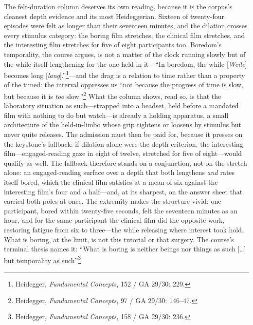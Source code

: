 \documentclass{article}
\begin{document}
The felt-duration column deserves its own reading, because it is the corpus's cleanest depth evidence and its most Heideggerian. Sixteen of twenty-four episodes were felt as longer than their seventeen minutes, and the dilation crosses every stimulus category: the boring film stretches, the clinical film stretches, and the interesting film stretches for five of eight participants too. Boredom's temporality, the course argues, is not a matter of the clock running slowly but of the while itself lengthening for the one held in it---``In boredom, the while [\textit{Weile}] becomes long [\textit{lang}].''\footnote{Heidegger, \textit{Fundamental Concepts}, 152 / GA 29/30: 229.}---and the drag is a relation to time rather than a property of the timed: the interval oppresses us ``not because the progress of time is slow, but because it is \textit{too} slow.''\footnote{Heidegger, \textit{Fundamental Concepts}, 97 / GA 29/30: 146--47.} What the column shows, read so, is that the laboratory situation as such---strapped into a headset, held before a mandated film with nothing to do but watch---is already a holding apparatus, a small architecture of the held-in-limbo whose grip tightens or loosens by stimulus but never quite releases. The admission must then be paid for, because it presses on the keystone's fallback: if dilation alone were the depth criterion, the interesting film---engaged-reading gaze in eight of twelve, stretched for five of eight---would qualify as well. The fallback therefore stands on a conjunction, not on the stretch alone: an engaged-reading surface over a depth that both lengthens \textit{and} rates itself bored, which the clinical film satisfies at a mean of six against the interesting film's four and a half---and, at its sharpest, on the answer sheet that carried both poles at once. The extremity makes the structure vivid: one participant, bored within twenty-five seconds, felt the seventeen minutes as an hour, and for the same participant the clinical film did the opposite work, restoring fatigue from six to three---the while releasing where interest took hold. What is boring, at the limit, is not this tutorial or that surgery. The course's terminal thesis names it: ``What is boring is neither beings nor things as such [\ldots] but temporality as such''\footnote{Heidegger, \textit{Fundamental Concepts}, 158 / GA 29/30: 236.}
\end{document}
